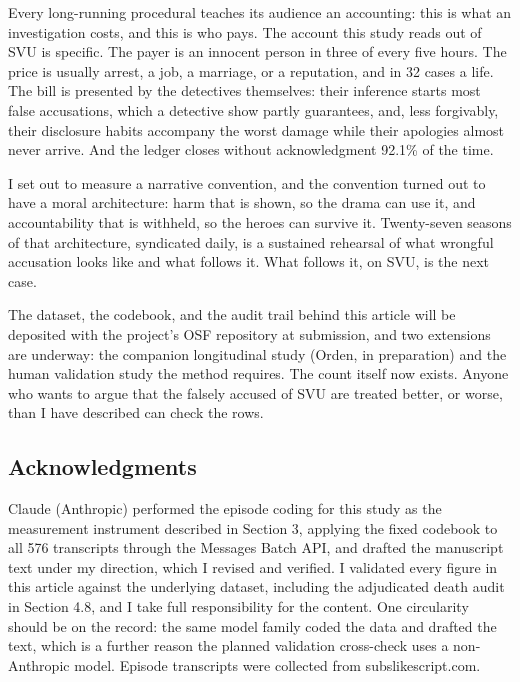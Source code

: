 \documentclass[
]{article}
\begin{document}
Every long-running procedural teaches its audience an accounting: this
is what an investigation costs, and this is who pays. The account this
study reads out of SVU is specific. The payer is an innocent person in
three of every five hours. The price is usually arrest, a job, a
marriage, or a reputation, and in 32 cases a life. The bill is presented
by the detectives themselves: their inference starts most false
accusations, which a detective show partly guarantees, and, less
forgivably, their disclosure habits accompany the worst damage while
their apologies almost never arrive. And the ledger closes without
acknowledgment 92.1\% of the time.

I set out to measure a narrative convention, and the convention turned
out to have a moral architecture: harm that is shown, so the drama can
use it, and accountability that is withheld, so the heroes can survive
it. Twenty-seven seasons of that architecture, syndicated daily, is a
sustained rehearsal of what wrongful accusation looks like and what
follows it. What follows it, on SVU, is the next case.

The dataset, the codebook, and the audit trail behind this article will
be deposited with the project's OSF repository at submission, and two
extensions are underway: the companion longitudinal study (Orden, in
preparation) and the human validation study the method requires. The
count itself now exists. Anyone who wants to argue that the falsely
accused of SVU are treated better, or worse, than I have described can
check the rows.

\subsection{Acknowledgments}\label{acknowledgments}

Claude (Anthropic) performed the episode coding for this study as the
measurement instrument described in Section 3, applying the fixed
codebook to all 576 transcripts through the Messages Batch API, and
drafted the manuscript text under my direction, which I revised and
verified. I validated every figure in this article against the
underlying dataset, including the adjudicated death audit in Section
4.8, and I take full responsibility for the content. One circularity
should be on the record: the same model family coded the data and
drafted the text, which is a further reason the planned validation
cross-check uses a non-Anthropic model. Episode transcripts were
collected from subslikescript.com.
\end{document}
